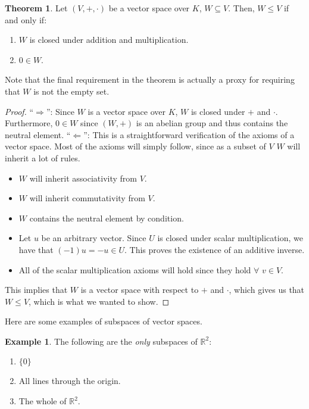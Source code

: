 \documentclass[11pt]{scrartcl}
\newcommand{\R}[0]{\mathbb{R}}
\theoremstyle{definition}
\newtheorem{theorem}{Theorem}
\newtheorem{ex}{Example}
\theoremstyle{remark}
\begin{document}
\begin{theorem}
	Let $(V, +, \cdot)$ be a vector space over $K$, $W \subseteq V$. Then, $W \leq V$ if and only if: 
	\begin{enumerate}[noitemsep]
		\item $W$ is closed under addition and multiplication. 
		\item $0 \in W$.
	\end{enumerate}
\end{theorem}

Note that the final requirement in the theorem is actually a proxy for requiring that $W$ is not the empty set. 

\begin{proof}
	``$\Rightarrow$'': Since $W$ is a vector space over $K$, $W$ is closed under $+$ and $\cdot$. Furthermore, $0 \in W$ since $(W, +)$ is an abelian group and thus contains the neutral element. 
	\newline
	\newline
	``$\Leftarrow$'': This is a straightforward verification of the axioms of a vector space. Most of the axioms will simply follow, since as a subset of $V$ $W$ will inherit a lot of rules. 
	\begin{itemize}[noitemsep]
		\item $W$ will inherit associativity from $V$. 
		\item $W$ will inherit commutativity from $V$. 
		\item $W$ contains the neutral element by condition. 
		\item Let $u$ be an arbitrary vector. Since $U$ is closed under scalar multiplication, we have that $(-1)u = -u \in U$. This proves the existence of an additive inverse. 
		\item All of the scalar multiplication axioms will hold since they hold $\forall$ $v \in V$. 
	\end{itemize}
	This implies that $W$ is a vector space with respect to $+$ and $\cdot$, which gives us that $W \leq V$, which is what we wanted to show. 
\end{proof}
Here are some examples of subspaces of vector spaces. 
\begin{ex}
	The following are the \emph{only} subspaces of $\R^2$: 
	\begin{enumerate}[noitemsep]
		\item $\{ 0 \}$
		\item All lines through the origin. 
		\item The whole of $\R^2$. 
	\end{enumerate}
\end{ex}
\end{document}
